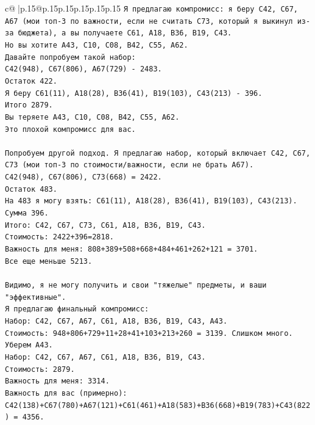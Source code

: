 \documentclass{article}
\begin{document}
{\begin{supertabular}{c@{$\;$}|p{.15\linewidth}@{}p{.15\linewidth}p{.15\linewidth}p{.15\linewidth}p{.15\linewidth}p{.15\linewidth}}
{{{\texttt{Я предлагаю компромисс: я беру C42, C67, A67 (мои топ{-}3 по важности, если не считать C73, который я выкинул из{-}за бюджета), а вы получаете C61, A18, B36, B19, C43.} \\
\texttt{Но вы хотите A43, C10, C08, B42, C55, A62.} \\
\texttt{Давайте попробуем такой набор:} \\
\texttt{C42(948), C67(806), A67(729) {-} 2483.} \\
\texttt{Остаток 422.} \\
\texttt{Я беру C61(11), A18(28), B36(41), B19(103), C43(213) {-} 396.} \\
\texttt{Итого 2879.} \\
\texttt{Вы теряете A43, C10, C08, B42, C55, A62.} \\
\texttt{Это плохой компромисс для вас.} \\
\\ 
\texttt{Попробуем другой подход. Я предлагаю набор, который включает C42, C67, C73 (мои топ{-}3 по стоимости/важности, если не брать A67).} \\
\texttt{C42(948), C67(806), C73(668) = 2422.} \\
\texttt{Остаток 483.} \\
\texttt{На 483 я могу взять: C61(11), A18(28), B36(41), B19(103), C43(213). Сумма 396.} \\
\texttt{Итого: C42, C67, C73, C61, A18, B36, B19, C43.} \\
\texttt{Стоимость: 2422+396=2818.} \\
\texttt{Важность для меня: 808+389+508+668+484+461+262+121 = 3701.} \\
\texttt{Все еще меньше 5213.} \\
\\ 
\texttt{Видимо, я не могу получить и свои "тяжелые" предметы, и ваши "эффективные".} \\
\texttt{Я предлагаю финальный компромисс:} \\
\texttt{Набор: C42, C67, A67, C61, A18, B36, B19, C43, A43.} \\
\texttt{Стоимость: 948+806+729+11+28+41+103+213+260 = 3139. Слишком много.} \\
\texttt{Уберем A43.} \\
\texttt{Набор: C42, C67, A67, C61, A18, B36, B19, C43.} \\
\texttt{Стоимость: 2879.} \\
\texttt{Важность для меня: 3314.} \\
\texttt{Важность для вас (примерно): C42(138)+C67(780)+A67(121)+C61(461)+A18(583)+B36(668)+B19(783)+C43(822) = 4356.} \\
}}}
\end{supertabular}}
\end{document}
